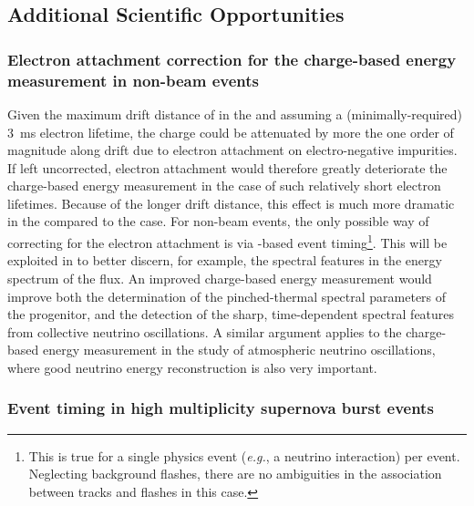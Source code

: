 
\subsection{Additional Scientific Opportunities}
\label{subsec:dp-pds-requirements_opportunities}

\subsubsection{Electron attachment correction for the charge-based energy measurement in non-beam events}
\label{subsubsec:dp-pds-requirements_attachment}

Given the maximum drift distance of \dpmaxdrift in the \dual {} and assuming a (minimally-required) \SI{3}{\ms} electron lifetime, the charge could be attenuated by more the one order of magnitude along drift due to electron attachment on electro-negative impurities. If left uncorrected, electron attachment would therefore greatly deteriorate the charge-based energy measurement in the case of such relatively short electron lifetimes. Because of the longer drift distance, this effect is much more dramatic in the \dual compared to the \single case. For non-beam events, the only possible way of correcting for the electron attachment is via -based event timing\footnote{This is true for a single physics event (\emph{e.g.}, a neutrino interaction) per  event. Neglecting background flashes, there are no ambiguities in the association between  tracks and  flashes in this case.}. This will be exploited in \dune to better discern, for example, the spectral features in the energy spectrum of the  flux. An improved charge-based energy measurement would improve both the determination of the pinched-thermal spectral parameters of the progenitor, and the detection of the sharp, time-dependent spectral features from collective neutrino oscillations. A similar argument applies to the charge-based energy measurement in the study of atmospheric neutrino oscillations, where good neutrino energy reconstruction is also very important.

\subsubsection{Event timing in high multiplicity supernova burst events}

